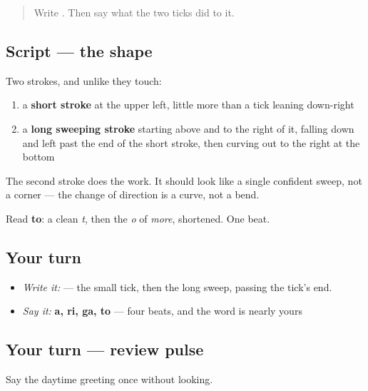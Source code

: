 \label{lesson:JA-W03-to}



\begin{quote}
Write . Then say what the two ticks did to it.
\end{quote}

\subsection*{Script — the shape}

\begin{quote}
\end{quote}

Two strokes, and unlike  they touch:

\begin{enumerate}
\raggedright
  \item a \textbf{short stroke} at the upper left, little more than a tick leaning down-right
  \item a \textbf{long sweeping stroke} starting above and to the right of it, falling down and left past the end of the short stroke, then curving out to the right at the bottom
\end{enumerate}

The second stroke does the work. It should look like a single confident sweep, not a corner — the change of direction is a curve, not a bend.

Read \textbf{to}: a clean \emph{t}, then the \emph{o} of \emph{more}, shortened. One beat.

\subsection*{Your turn}
\begin{itemize}
\raggedright
  \item \emph{Write it:}  — the small tick, then the long sweep, passing the tick's end.
  \item \emph{Say it:} \textbf{a, ri, ga, to} — four beats, and the word is nearly yours
\end{itemize}

\subsection*{Your turn — review pulse}
Say the daytime greeting once without looking.

